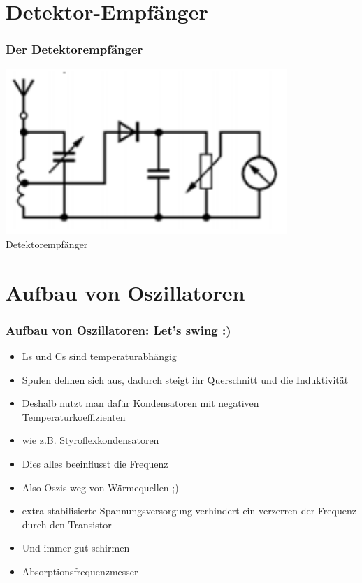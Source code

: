 \section*{Detektor-Empfänger}
\begin{frame}
\frametitle{Der Detektorempfänger}
    \begin{center}
        \includegraphics[width=0.8\textwidth]{a17/TJ601.png}\\
       Detektorempfänger \cite{bna}
    \end{center}
\end{frame}

\section*{Aufbau von Oszillatoren}
\begin{frame}
\frametitle{Aufbau von Oszillatoren: Let's swing :)}
\begin{itemize}
	\item	Ls und Cs sind temperaturabhängig
	\item	Spulen dehnen sich aus, dadurch steigt ihr Querschnitt und die Induktivität
	\item	Deshalb nutzt man dafür Kondensatoren mit negativen Temperaturkoeffizienten
	\item	wie z.B. Styroflexkondensatoren
	\item	Dies alles beeinflusst die Frequenz
	\item	Also Oszis weg von Wärmequellen ;)
	\item	extra stabilisierte Spannungsversorgung verhindert ein verzerren der Frequenz durch den Transistor
	\item	Und immer gut schirmen
    \item   Absorptionsfrequenzmesser
\end{itemize}
\end{frame}

